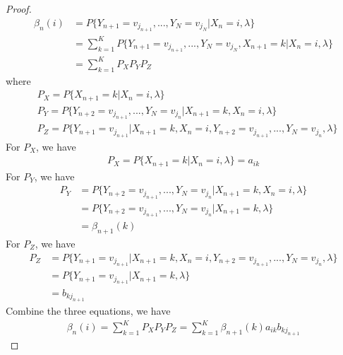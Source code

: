 \documentclass[runningheads]{llncs}
\begin{document}
    \subsection{}
    \begin{proof}
        \begin{align}
            \beta_{n}(i) &= P \{ Y_{n+1} = v_{j_{n+1}},...,Y_N = v_{j_N} | X_n = i, \lambda \} \\
            &= \sum_{k=1}^K P \{ Y_{n+1} = v_{j_{n+1}},...,Y_N = v_{j_N}, X_{n+1} = k | X_n = i, \lambda \} \\
            &= \sum_{k=1}^K P_X P_Y P_Z
        \end{align}
        where
        \begin{align}
            &P_X = P \{ X_{n+1} = k | X_n = i, \lambda \} \\
            &P_Y = P \{ Y_{n+2} = v_{j_{n+1}},..., Y_N = v_{j_n} | X_{n+1} = k, X_n = i, \lambda \} \\
            &P_Z = P \{ Y_{n+1} = v_{j_{n+1}} | X_{n+1} = k, X_n = i, Y_{n+2} = v_{j_{n+1}},..., Y_N = v_{j_n}, \lambda \}
        \end{align}
        For $P_X$, we have
        \begin{align}
            P_X = P \{ X_{n+1} = k | X_n = i, \lambda \} = a_{ik}
        \end{align}
        For $P_Y$, we have
        \begin{align}
            P_Y &= P \{ Y_{n+2} = v_{j_{n+1}},..., Y_N = v_{j_n} | X_{n+1} = k, X_n = i, \lambda \} \\
            &= P \{ Y_{n+2} = v_{j_{n+1}},..., Y_N = v_{j_n} | X_{n+1} = k, \lambda \} \\
            &= \beta_{n+1}(k)
        \end{align}
        For $P_Z$, we have
        \begin{align}
            P_Z &= P \{ Y_{n+1} = v_{j_{n+1}} | X_{n+1} = k, X_n = i, Y_{n+2} = v_{j_{n+1}},..., Y_N = v_{j_n}, \lambda \} \\
            &= P \{ Y_{n+1} = v_{j_{n+1}} | X_{n+1} = k, \lambda \} \\
            &= b_{kj_{n+1}}
        \end{align}
        Combine the three equations, we have
        \begin{align}
            \beta_n(i) = \sum_{k=1}^K P_X P_Y P_Z = \sum_{k=1}^K \beta_{n+1}(k) a_{ik} b_{kj_{n+1}}
        \end{align}
    \end{proof}
\end{document}
